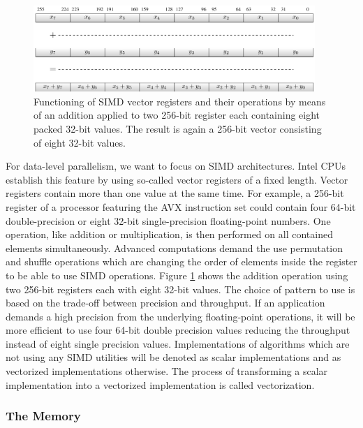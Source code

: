 \documentclass{stdlocal}
\begin{document}
    \begin{figure}
      \center
      \includegraphics[width=0.95\textwidth]{figures/simd_vector_operations.pdf}
      \caption[SIMD Vector Registers and Operations]{%
        Functioning of SIMD vector registers and their operations by means of an addition applied to two 256-bit register each containing eight packed 32-bit values.
        The result is again a 256-bit vector consisting of eight 32-bit values.
      }
      \label{fig:simd-vector-operation}
    \end{figure}

    For data-level parallelism, we want to focus on SIMD architectures.
    Intel CPUs establish this feature by using so-called vector registers of a fixed length.
    Vector registers contain more than one value at the same time.
    For example, a 256-bit register of a processor featuring the AVX instruction set could contain four 64-bit double-precision or eight 32-bit single-precision floating-point numbers.
    One operation, like addition or multiplication, is then performed on all contained elements simultaneously.
    Advanced computations demand the use permutation and shuffle operations which are changing the order of elements inside the register to be able to use SIMD operations.
    Figure \ref{fig:simd-vector-operation} shows the addition operation using two 256-bit registers each with eight 32-bit values.
    The choice of pattern to use is based on the trade-off between precision and throughput.
    If an application demands a high precision from the underlying floating-point operations, it will be more efficient to use four 64-bit double precision values reducing the throughput instead of eight single precision values.
    Implementations of algorithms which are not using any SIMD utilities will be denoted as scalar implementations and as vectorized implementations otherwise.
    The process of transforming a scalar implementation into a vectorized implementation is called vectorization.
    \autocite{intel-optimization-reference,fog2019a,fog2019d,dolbeau2016}

    \subsubsection*{The Memory}
\end{document}
